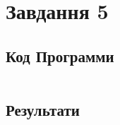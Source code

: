 \section{Завдання 5}
\label{sec:task5}

\subsection{Код Программи}
\label{subsec:task5_code}
\inputminted{python}{../src/task5.py}

\subsection{Результати}
\label{subsec:task5_results}
